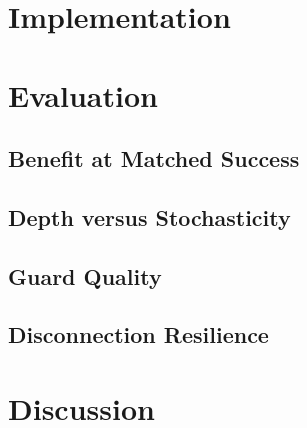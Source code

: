 \section{Implementation}
\label{sec:spec-impl}

\section{Evaluation}
\label{sec:spec-eval}
\subsection{Benefit at Matched Success}
\subsection{Depth versus Stochasticity}
\subsection{Guard Quality}
\subsection{Disconnection Resilience}

\section{Discussion}
\label{sec:spec-discussion}
